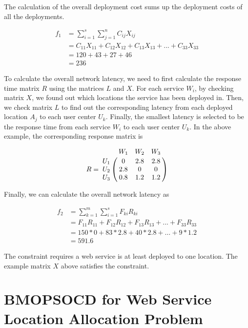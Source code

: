 \documentclass[10pt,journal,compsoc]{IEEEtran}
\let\bbordermatrix\bordermatrix
\begin{document}
The calculation of the overall deployment cost sums up the deployment costs of all the deployments.
\begin{small}
\begin{align*}
f_1 & = \sum\limits_{i=1}^s \sum\limits_{j = 1}^n C_{ij} X_{ij}\\
& = C_{11} X_{11} + C_{12} X_{12} + C_{13} X_{13} + ... + C_{33} X_{33} \\
& = 120 + 43 + 27 + 46 \\
& = 236
\end{align*}
 \end{small}

To calculate the overall network latency, we need to first calculate the response time matrix $R$ using the matrices $L$ and $X$. For each service $W_i$, by checking matrix $X$, we found out which locations the service has been deployed in. Then, we check matrix $L$ to find out the corresponding latency from each deployed location $A_j$ to each user center $U_k$. Finally, the smallest latency is selected to be the response time from each service $W_i$ to each user center $U_k$. In the above example, the corresponding response matrix is
\begin{small}
$$
R = \bbordermatrix{~ & W_{1} & W_{2} & W_{3}\cr
	U_{1}	&0 &2.8 &2.8	\cr
	U_{2}	&2.8  &0 &0	\cr
	U_{3}	&0.8 &1.2 &1.2	\cr}
$$
\end{small}

Finally, we can calculate the overall network latency as
\begin{small}
\begin{equation*}
\begin{aligned}
f_2 & = \sum\limits_{k=1}^m \sum\limits_{i=1}^s F_{ki} R_{ki}\\
  & = F_{11} R_{11} + F_{12} R_{12} + F_{13} R_{13} + ... + F_{33} R_{33} \\
  &= 150 * 0 + 83 * 2.8 + 40 * 2.8 + \dots + 9 * 1.2 \\
  &= 591.6
\end{aligned}
\end{equation*}
\end{small}


The constraint requires a web service is at least deployed to one location. The example matrix $X$ above satisfies the constraint.

\vspace{-3 mm}
\section{BMOPSOCD for Web Service Location Allocation Problem} \label{sec:methods}
\end{document}
